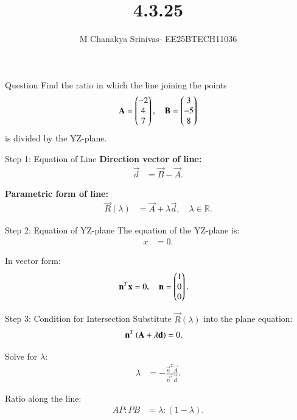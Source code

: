 \documentclass{beamer}
\title %
{4.3.25}
\date{}
\author %
{M Chanakya Srinivas- EE25BTECH11036}
\begin{document}
\frame{\titlepage}










\begin{frame}{Question}
Find the ratio in which the line joining the points
\[
\mathbf{A} = \begin{pmatrix}-2 \\ 4 \\ 7\end{pmatrix}, \quad 
\mathbf{B} = \begin{pmatrix}3 \\ -5 \\ 8\end{pmatrix}
\]
is divided by the YZ-plane.
\end{frame}

\begin{frame}{Step 1: Equation of Line}
\textbf{Direction vector of line:}
\begin{align}
\vec{d} &= \vec{B} - \vec{A}.
\end{align}

\textbf{Parametric form of line:}
\begin{align}
\vec{R}(\lambda) &= \vec{A} + \lambda \vec{d}, \quad \lambda \in \mathbb{R}.
\end{align}
\end{frame}

\begin{frame}{Step 2: Equation of YZ-plane}
The equation of the YZ-plane is:
\begin{align}
x &= 0.
\end{align}

In vector form:
\begin{align}
\mathbf{n}^T \mathbf{x} &= 0, \quad 
\mathbf{n} = \begin{pmatrix}1 \\ 0 \\ 0\end{pmatrix}.
\end{align}
\end{frame}

\begin{frame}{Step 3: Condition for Intersection}
Substitute $\vec{R}(\lambda)$ into the plane equation:
\begin{align}
\mathbf{n}^T \left(\mathbf{A} + \lambda \mathbf{d}\right) &= 0.
\end{align}

Solve for $\lambda$:
\begin{align}
\lambda &= -\frac{\vec{n}^T \vec{A}}{\vec{n}^T \vec{d}}.
\end{align}

Ratio along the line:
\begin{align}
AP : PB &= \lambda : (1-\lambda).
\end{align}
\end{frame}
\end{document}
